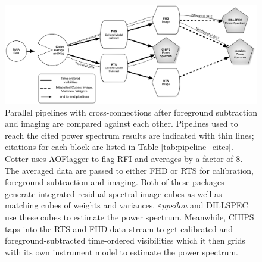 \documentclass[twolcolumn,iop]{emulateapj}
\def\eppsilon{{\it $\varepsilon$ppsilon}}
\def\empirical{DILLSPEC}
\begin{document}

\begin{figure}[htbp]
\begin{center}
\includegraphics[width=\textwidth]{figures/MWA_Pipes.png}
\caption{Parallel pipelines with cross-connections after foreground subtraction and imaging are compared against each other. Pipelines used to reach the cited power spectrum results are indicated with thin lines; citations for each block are listed in Table \ref{tab:pipeline_cites}. Cotter uses AOFlagger to flag RFI and averages by a factor of 8. The averaged data are passed to either FHD or RTS for calibration, foreground subtraction and imaging. Both of these packages generate integrated residual spectral image cubes as well as matching cubes of weights and variances.  \eppsilon{} and \empirical{} use these cubes to estimate the power spectrum. Meanwhile, CHIPS taps into the RTS and FHD data stream to get calibrated and foreground-subtracted time-ordered  visibilities which it then grids with its own instrument model to estimate the power spectrum. 
}
\label{fig:pipes}
\end{center}
\end{figure}
\end{document}
